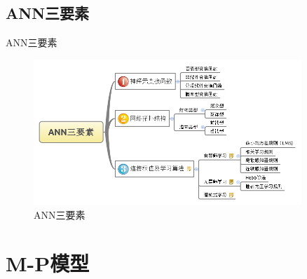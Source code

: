 \documentclass[xcolor=svgnames]{beamer}
\begin{document}
\subsection{ANN三要素}

\begin{frame}{ANN三要素}
  \begin{figure}
    \centering
    \includegraphics[width=0.9\textwidth]{fig19.png}
    \vspace{-1em}
    \caption{ANN三要素}
    \label{fig:3elements}
  \end{figure}
\end{frame}

\section{M-P模型}
\label{sec:mp}
\end{document}
